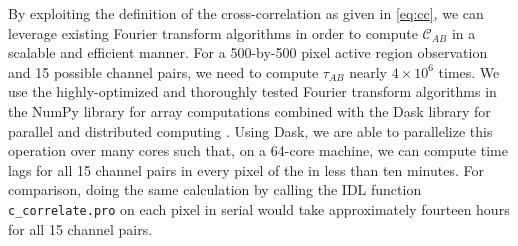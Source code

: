 By exploiting the definition of the cross-correlation as given in \autoref{eq:cc}, we can leverage existing Fourier transform algorithms in order to compute $\mathcal{C}_{AB}$ in a scalable and efficient manner. For a 500-by-500 pixel active region observation and 15 possible channel pairs, we need to compute $\tau_{AB}$ nearly $4\times10^6$ times. We use the highly-optimized and thoroughly tested Fourier transform algorithms in the NumPy library for array computations \citep{oliphant_guide_2006} combined with the Dask library for parallel and distributed computing \citep{rocklin_dask_2015-1}. Using Dask, we are able to parallelize this operation over many cores such that, on a 64-core machine, we can compute time lags for all 15 channel pairs in every pixel of the \AR{} in less than ten minutes. For comparison, doing the same calculation by calling the IDL function \texttt{c\_correlate.pro} on each pixel in serial would take approximately fourteen hours for all 15 channel pairs.
